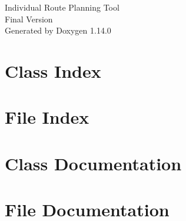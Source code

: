 \documentclass[twoside]{book}
\newcommand{\+}{\discretionary{\mbox{\scriptsize$\hookleftarrow$}}{}{}}
\newcommand{\clearemptydoublepage}{%
    \newpage{\pagestyle{empty}\cleardoublepage}%
  }
\begin{document}
  \raggedbottom
    \hypersetup{pageanchor=false,
                bookmarksnumbered=true,
                pdfencoding=unicode
               }
  \begin{titlepage}
  \vspace*{7cm}
  \begin{center}%
  {\Large Individual Route Planning Tool}\\
  [1ex]\large Final Version \\
  \vspace*{1cm}
  {\large Generated by Doxygen 1.14.0}\\
  \end{center}
  \end{titlepage}
  \clearemptydoublepage
  \tableofcontents
  \clearemptydoublepage
  \hypersetup{pageanchor=true}
\chapter{Class Index}

\chapter{File Index}

\chapter{Class Documentation}







\chapter{File Documentation}




































  \backmatter
  \newpage
  \clearemptydoublepage
  \printindex
\end{document}

